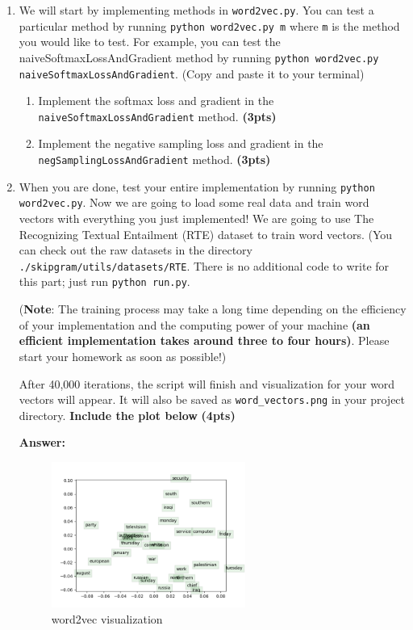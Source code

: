 \documentclass{assignment format}
\newenvironment{answer}{
    {\bf Answer:} \begingroup\color{red}
}{\endgroup}%
\begin{document}
\begin{enumerate}[label=(\alph*)]
    \item We will start by implementing methods in \texttt{word2vec.py}. You can test a particular method by running \texttt{python word2vec.py m} where \texttt{m} is the method you would like to test. For example, you can test the naiveSoftmaxLossAndGradient method by running \texttt{python word2vec.py naiveSoftmaxLossAndGradient}. (Copy and paste it to your terminal)
        \begin{enumerate}[label=(\roman*)]
        \item Implement the softmax loss and gradient in the \texttt{naiveSoftmaxLossAndGradient} method. \textbf{(3pts)}
        \item Implement the negative sampling loss and gradient in the \texttt{negSamplingLossAndGradient} method. \textbf{(3pts)}
    \end{enumerate}
    \item When you are done, test your entire implementation by running \texttt{python word2vec.py}. Now we are going to load some real data and train word vectors with everything you just implemented! We are going to use The Recognizing Textual Entailment (RTE) dataset to train word vectors. (You can check out the raw datasets in the directory \texttt{./skipgram/utils/datasets/RTE}. There is no additional code to write for this part; just run \texttt{python run.py}.

    (\textbf{Note}: The training process may take a long time depending on the efficiency of your implementation and the computing power of your machine \textbf{(an efficient implementation takes around three to four hours)}. Please start your homework as soon as possible!)

    After 40,000 iterations, the script will finish and visualization for your word vectors will appear. It will also be saved as \texttt{word\_vectors.png} in your project directory. \textbf{Include the plot below} \textbf{(4pts)}
    
    \begin{answer}
\begin{figure}[h]
    \centering
    \includegraphics[width=0.6\textwidth]{./figures/word_vectors.png}
    \caption{word2vec visualization}
    \label{fig:word2vec_vis}
\end{figure}
    \end{answer}
\end{enumerate}
\end{document}
